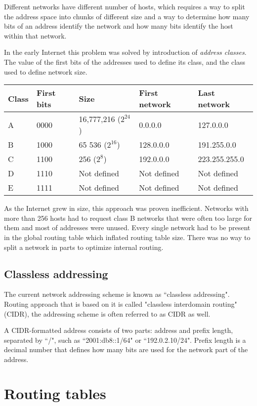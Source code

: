 Different networks have different number of hosts, which requires a way to split the address space into chunks of
different size and a way to determine how many bits of an address identify the network and how many bits
identify the host within that network.

In the early Internet this problem was solved by introduction of \emph{address classes}. The value of the first
bits of the addresses used to define its class, and the class used to define network size.

\begin{tabular}{|l|l|l|l|l|}
\hline
Class & First bits & Size & First network & Last network \\
\hline
A & 0000 & 16,777,216 ($2^{24}$) & 0.0.0.0 & 127.0.0.0 \\
\hline
B & 1000 & 65 536 ($2^{16}$) & 128.0.0.0 & 191.255.0.0 \\
\hline
C & 1100 & 256 ($2^{8}$) & 192.0.0.0 & 223.255.255.0 \\
\hline
D & 1110 & Not defined & Not defined & Not defined \\
\hline
E & 1111 & Not defined & Not defined & Not defined \\
\hline
\end{tabular}

As the Internet grew in size, this approach was proven inefficient. Networks with more than 256 hosts had to
request class B networks that were often too large for them and most of addresses were unused. Every single
network had to be present in the global routing table which inflated routing table size. There was no way
to split a network in parts to optimize internal routing.

\subsection{Classless addressing}

The current network addressing scheme is known as ``classless addressing". Routing approach that is based on it
is called "classless interdomain routing" (CIDR), the addressing scheme is often referred to as	CIDR as well.

A CIDR-formatted address consists of two parts: address and prefix length, separated by ``/", such as 
``2001:db8::1/64" or ``192.0.2.10/24". Prefix length is a decimal number that defines how many bits are used
for the network part of the address.




\section{Routing tables}

